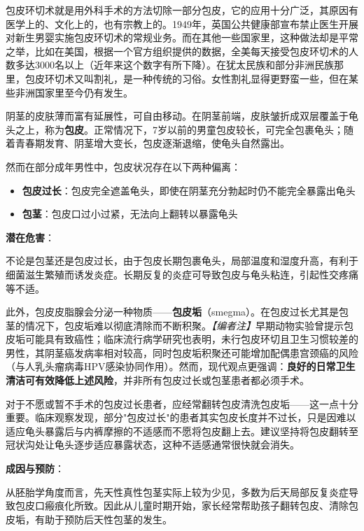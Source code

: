 \documentclass[12pt,a4paper,twoside]{ctexbook}
\begin{document}
包皮环切术就是用外科手术的方法切除一部分包皮，它的应用十分广泛，其原因有医学上的、文化上的，也有宗教上的。1949年，英国公共健康部宣布禁止医生开展对新生男婴实施包皮环切术的常规业务。而在其他一些国家里，这种做法却是平常之举，比如在美国，根据一个官方组织提供的数据，全美每天接受包皮环切术的人数多达3000名以上（近年来这个数字有所下降）。在犹太民族和部分非洲民族那里，包皮环切术又叫割礼，是一种传统的习俗。女性割礼显得更野蛮一些，但在某些非洲国家里至今仍有发生。

阴茎的皮肤薄而富有延展性，可自由移动。在阴茎前端，皮肤皱折成双层覆盖于龟头之上，称为\textbf{包皮}。正常情况下，7岁以前的男童包皮较长，可完全包裹龟头；随着青春期发育、阴茎增大变长，包皮逐渐退缩，使龟头自然露出。

然而在部分成年男性中，包皮状况存在以下两种偏离：

\begin{itemize}
	\item \textbf{包皮过长}：包皮完全遮盖龟头，即使在阴茎充分勃起时仍不能完全暴露出龟头
	\item \textbf{包茎}：包皮口过小过紧，无法向上翻转以暴露龟头
\end{itemize}

\vspace{0.5em}
\noindent\textbf{潜在危害}：

不论是包茎还是包皮过长，由于包皮长期包裹龟头，局部温度和湿度升高，有利于细菌滋生繁殖而诱发炎症。长期反复的炎症可导致包皮与龟头粘连，引起性交疼痛等不适。

此外，包皮皮脂腺会分泌一种物质——\textbf{包皮垢}（smegma）。在包皮过长尤其是包茎的情况下，包皮垢难以彻底清除而不断积聚。\textit{【编者注】}早期动物实验曾提示包皮垢可能具有致癌性；临床流行病学研究也表明，未行包皮环切且卫生习惯较差的男性，其阴茎癌发病率相对较高，同时包皮垢积聚还可能增加配偶患宫颈癌的风险（与人乳头瘤病毒HPV感染协同作用）。然而，现代观点更强调：\textbf{良好的日常卫生清洁可有效降低上述风险}，并非所有包皮过长或包茎患者都必须手术。

对于不愿或暂不手术的包皮过长患者，应经常翻转包皮清洗包皮垢——这一点十分重要。临床观察发现，部分"包皮过长"的患者其实包皮长度并不过长，只是因难以适应龟头暴露后与内裤摩擦的不适感而不愿将包皮翻上去。建议坚持将包皮翻转至冠状沟处让龟头逐步适应暴露状态，这种不适感通常很快就会消失。

\vspace{0.5em}
\noindent\textbf{成因与预防}：

从胚胎学角度而言，先天性真性包茎实际上较为少见，多数为后天局部反复炎症导致包皮口瘢痕化所致。因此从儿童时期开始，家长经常帮助孩子翻转包皮、清除包皮垢，有助于预防后天性包茎的发生。
\end{document}
